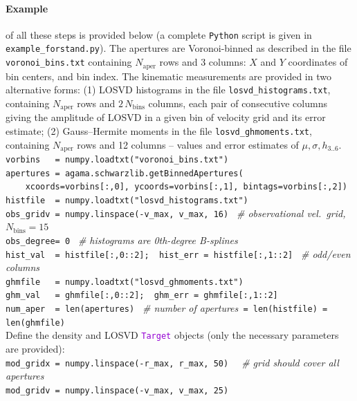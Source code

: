 \documentclass[12pt]{article}
\newcommand{\Python}{\texttt{Python}\xspace}
\newcommand{\ttt}[1]{\textcolor{darkviolet}{\texttt{#1}}}
\begin{document}
\paragraph{Example} \label{sec:SchwarzschildExample} of all these steps is provided below (a complete \Python script is given in \texttt{example_forstand.py}). The apertures are Voronoi-binned as described in the file \texttt{voronoi_bins.txt} containing $N_\mathrm{aper}$ rows and 3 columns: $X$ and $Y$ coordinates of bin centers, and bin index. The kinematic measurements are provided in two alternative forms: (1) LOSVD histograms in the file \texttt{losvd_histograms.txt}, containing $N_\mathrm{aper}$ rows and $2\,N_\mathrm{bins}$ columns, each pair of consecutive columns giving the amplitude of LOSVD in a given bin of velocity grid and its error estimate; (2) Gauss--Hermite moments in the file \texttt{losvd_ghmoments.txt}, containing $N_\mathrm{aper}$ rows and 12 columns -- values and error estimates of $\mu, \sigma, h_{3..6}$.\\[2mm]
\texttt{vorbins~~~= numpy.loadtxt("voronoi_bins.txt")\\
apertures~= agama.schwarzlib.getBinnedApertures(\\
\mbox{}~~~~xcoords=vorbins[:,0], ycoords=vorbins[:,1], bintags=vorbins[:,2])\\
histfile~~= numpy.loadtxt("losvd_histograms.txt")\\
obs_gridv~= numpy.linspace(-v_max, v_max, 16)}
\textit{\color{Sepia} \ \# observational vel.~grid, $N_\mathrm{bins}=15$}\\
\texttt{obs_degree= 0}
\textit{\color{Sepia} \ \# histograms are 0th-degree B-splines}\\
\texttt{hist_val~~= histfile[:,0::2];~~hist_err = histfile[:,1::2]}
\textit{\color{Sepia} \ \# odd/even columns}\\
\texttt{ghmfile~~~= numpy.loadtxt("losvd_ghmoments.txt")\\
ghm_val~~~= ghmfile[:,0::2];~~ghm_err = ghmfile[:,1::2]\\
num_aper~~= len(apertures)} 
{\color{Sepia}\textit{\ \# number of apertures}\texttt{ = len(histfile) = len(ghmfile)}}\\[2mm]
Define the density and LOSVD \ttt{Target} objects (only the necessary parameters are provided):\\[2mm]
\texttt{mod_gridx~= numpy.linspace(-r_max, r_max, 50)}
\textit{\color{Sepia} \ \ \# grid should cover all apertures}\\
\texttt{mod_gridv~= numpy.linspace(-v_max, v_max, 25)}
\end{document}
